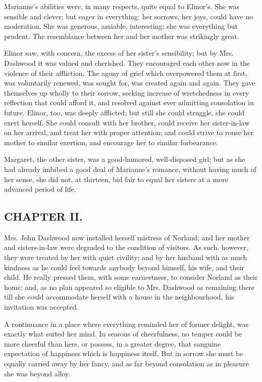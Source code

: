 Marianne's abilities were, in many respects, quite equal to Elinor's. She was sensible and clever; but eager in everything: her sorrows, her joys, could have no moderation. She was generous, amiable, interesting: she was everything but prudent. The resemblance between her and her mother was strikingly great.

Elinor saw, with concern, the excess of her sister's sensibility; but by Mrs. Dashwood it was valued and cherished. They encouraged each other now in the violence of their affliction. The agony of grief which overpowered them at first, was voluntarily renewed, was sought for, was created again and again. They gave themselves up wholly to their sorrow, seeking increase of wretchedness in every reflection that could afford it, and resolved against ever admitting consolation in future. Elinor, too, was deeply afflicted; but still she could struggle, she could exert herself. She could consult with her brother, could receive her sister-in-law on her arrival, and treat her with proper attention; and could strive to rouse her mother to similar exertion, and encourage her to similar forbearance.

Margaret, the other sister, was a good-humored, well-disposed girl; but as she had already imbibed a good deal of Marianne's romance, without having much of her sense, she did not, at thirteen, bid fair to equal her sisters at a more advanced period of life.

\subsection[chapter-ii.]{\useURL[url2][][][]\from[url2]CHAPTER II.}

Mrs. John Dashwood now installed herself mistress of Norland; and her mother and sisters-in-law were degraded to the condition of visitors. As such, however, they were treated by her with quiet civility; and by her husband with as much kindness as he could feel towards anybody beyond himself, his wife, and their child. He really pressed them, with some earnestness, to consider Norland as their home; and, as no plan appeared so eligible to Mrs. Dashwood as remaining there till she could accommodate herself with a house in the neighbourhood, his invitation was accepted.

A continuance in a place where everything reminded her of former delight, was exactly what suited her mind. In seasons of cheerfulness, no temper could be more cheerful than hers, or possess, in a greater degree, that sanguine expectation of happiness which is happiness itself. But in sorrow she must be equally carried away by her fancy, and as far beyond consolation as in pleasure she was beyond alloy.

